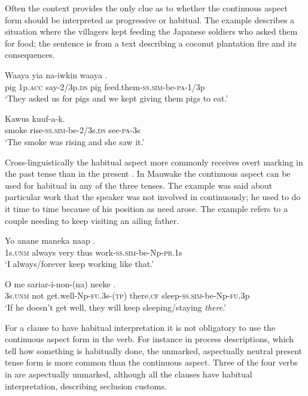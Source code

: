 Often the context provides the only clue as to whether the continuous aspect form should be interpreted as progressive or habitual. The example  describes a situation where the villagers kept feeding the Japanese soldiers who asked them for food; the sentence  is from a text describing a coconut plantation fire and its consequences.

\ea%
\label{ex:3:x354}
\gll Waaya yia na-iwkin waaya . \\
pig 1p.\textsc{acc} say-2/3p.\textsc{ds} pig feed.them-\textsc{ss}.\textsc{sim}-be-\textsc{pa}-1/3p\\
\glt`They asked us for pigs and we kept giving them pigs to eat.'
\z

\ea%
\label{ex:3:x355}
\gll Kawus  kuuf-a-k. \\
smoke rise-\textsc{ss}.\textsc{sim}-be-2/3s.\textsc{ds} see-\textsc{pa}-3s\\
\glt`The smoke was rising and she saw it.'
\z

Cross-linguistically the habitual aspect more commonly receives overt marking in the past tense than in the present \citep[154]{Cristofaro2006}. In Mauwake the continuous aspect can be used for habitual in any of the three tenses. The example  was said about particular work that the speaker was not involved in continuously; he used to do it time to time because of his position as need arose. The example  refers to a couple needing to keep visiting an ailing father. 

\ea%
\label{ex:3:x1063}
\gll Yo anane maneka naap . \\
1s.\textsc{unm} always very thus work-\textsc{ss}.\textsc{sim}-be-Np-\textsc{pr}.1s\\
\glt`I always/forever keep working like that.'
\z

\ea%
\label{ex:3:x1064}
\gll O me sariar-i-non-(na) neeke . \\
3s.\textsc{unm} not get.well-Np-\textsc{fu}.3s-(\textsc{tp}) there.\textsc{cf} sleep-\textsc{ss}.\textsc{sim}-be-Np-\textsc{fu}.3p\\
\glt`If he doesn't get well, they will keep sleeping/staying \textit{there}.' 
\z

For a clause to have habitual interpretation it is not obligatory to use the continuous aspect form in the verb. For instance in process descriptions, which tell how something is habitually done, the unmarked, aspectually neutral present tense form is more common than the continuous aspect. Three of the four verbs in  are aspectually unmarked, although all the clauses have habitual interpretation, describing seclusion customs.

